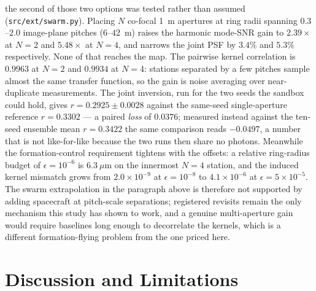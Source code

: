 \documentclass[twocolumn,10pt]{article}
\begin{document}
 the second of those two
options was tested rather than assumed ({\tt src/ext/swarm.py}). Placing $N$
co-focal 1~m apertures at ring radii spanning $0.3$--$2.0$ image-plane pitches
($6$--$42$~m) raises the harmonic mode-SNR gain to $2.39\times$ at $N=2$ and
$5.48\times$ at $N=4$, and narrows the joint PSF by $3.4\%$ and $5.3\%$
respectively. None of that reaches the map. The pairwise kernel correlation is
$0.9963$ at $N=2$ and $0.9934$ at $N=4$: stations separated by a few pitches
sample almost the same transfer function, so the gain is noise averaging over
near-duplicate measurements. The joint inversion, run for the two seeds the
sandbox could hold, gives $r=0.2925\pm0.0028$ against the same-seed
single-aperture reference $r=0.3302$ --- a paired {\it loss} of $0.0376$;
measured instead against the ten-seed ensemble mean $r=0.3422$ the same
comparison reads $-0.0497$, a number that is not like-for-like because the
two runs then share no photons. Meanwhile the
formation-control requirement tightens with the offsets: a relative ring-radius
budget of $\epsilon=10^{-6}$ is $6.3\ \mu$m on the innermost $N=4$ station, and
the induced kernel mismatch grows from $2.0\times10^{-9}$ at
$\epsilon=10^{-8}$ to $4.1\times10^{-6}$ at $\epsilon=5\times10^{-5}$. The
swarm extrapolation in the paragraph above is therefore not supported by adding
spacecraft at pitch-scale separations; registered revisits remain the only
mechanism this study has shown to work, and a genuine multi-aperture gain would
require baselines long enough to decorrelate the kernels, which is a different
formation-flying problem from the one priced here.

\section{Discussion and Limitations}
\label{sec:discussion}
\end{document}
